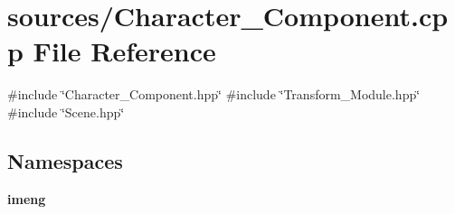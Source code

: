 \section{sources/\+Character\+\_\+\+Component.cpp File Reference}
\label{_character___component_8cpp}
{\ttfamily \#include \char`\"{}Character\+\_\+\+Component.\+hpp\char`\"{}}\newline
{\ttfamily \#include \char`\"{}Transform\+\_\+\+Module.\+hpp\char`\"{}}\newline
{\ttfamily \#include \char`\"{}Scene.\+hpp\char`\"{}}\newline
\subsection*{Namespaces}
\begin{DoxyCompactItemize}
\item 
 \textbf{ imeng}
\end{DoxyCompactItemize}
